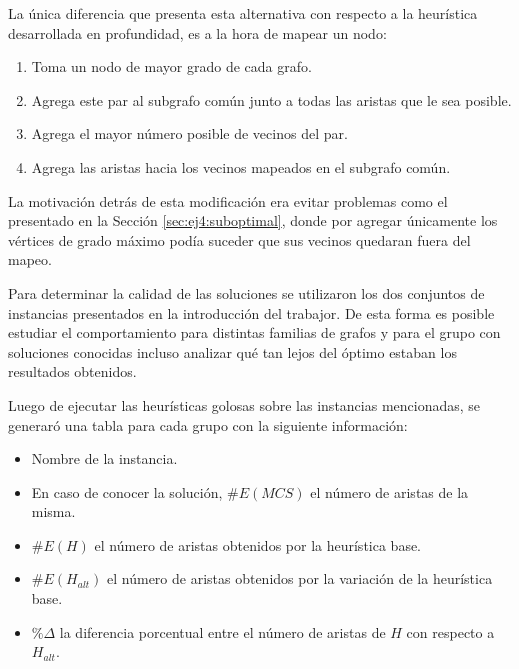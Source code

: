 La única diferencia que presenta esta alternativa con respecto a la heurística
desarrollada en profundidad, es a la hora de mapear un nodo:

\begin{enumerate}
	\item Toma un nodo de mayor grado de cada grafo.
	\item Agrega este par al subgrafo común junto a todas las aristas que le sea
		posible.
	\item Agrega el mayor número posible de vecinos del par.
	\item Agrega las aristas hacia los vecinos mapeados en el subgrafo común.
\end{enumerate}

La motivación detrás de esta modificación era evitar problemas como el presentado en
la Sección \ref{sec:ej4:suboptimal}, donde por agregar únicamente los vértices de
grado máximo podía suceder que sus vecinos quedaran fuera del mapeo.

Para determinar la calidad de las soluciones se utilizaron los dos conjuntos de
instancias presentados en la introducción del trabajor. De esta forma es posible estudiar
el comportamiento para distintas familias de grafos y para el grupo con
soluciones conocidas incluso analizar qué tan lejos del óptimo estaban los
resultados obtenidos.

Luego de ejecutar las heurísticas golosas sobre las instancias mencionadas, se
generaró una tabla para cada grupo con la siguiente información:

\begin{itemize}
	\item Nombre de la instancia.
	\item En caso de conocer la solución, $\#E(MCS)$ el número de aristas de la
		misma.
	\item $\#E(H)$ el número de aristas obtenidos por la heurística base.
	\item $\#E(H_{alt})$ el número de aristas obtenidos por la variación de la heurística base.
	\item $\% \Delta$ la diferencia porcentual entre el número de aristas de $H$
		con respecto a $H_{alt}$.
\end{itemize}



